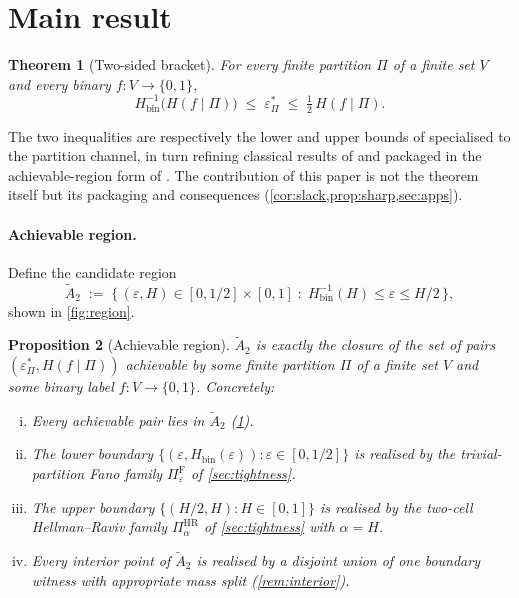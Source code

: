 \documentclass[10pt]{article}
\newtheorem{theorem}{Theorem}
\newtheorem{proposition}[theorem]{Proposition}
\theoremstyle{definition}
\theoremstyle{remark}
\newcommand{\Hbin}{H_{\mathrm{bin}}}
\newcommand{\Hinv}{H_{\mathrm{bin}}^{-1}}
\newcommand{\eps}{\varepsilon}
\newcommand{\epsP}{\eps^{\!*}_{\Pi}}
\newcommand{\Atilde}{\widetilde{A}_{2}}
\begin{document}
\section{Main result}\label{sec:main}

\begin{theorem}[Two-sided bracket]\label{thm:sandwich}
For every finite partition $\Pi$ of a finite set $V$ and every
binary $f : V \to \{0, 1\}$,
\begin{equation}\label{eq:sandwich}
  \Hinv\!\bigl(H(f \mid \Pi)\bigr)
  \;\le\; \epsP
  \;\le\; \tfrac{1}{2}\,H(f \mid \Pi).
\end{equation}
\end{theorem}

The two inequalities are respectively the lower and upper bounds
of \citet{ho2010interplay} specialised to the partition channel,
in turn refining classical results of \citet{fano1961} and
\citet{hellmanraviv1970} packaged in the achievable-region form
of \citet{feder1994}. The contribution of this paper is not the
theorem itself but its packaging and consequences
(\cref{cor:slack,prop:sharp,sec:apps}).

\paragraph{Achievable region.} Define the candidate region
\[
  \Atilde
  \;:=\; \bigl\{\,(\eps, H) \in [0, 1/2] \times [0, 1]
    \;:\; \Hinv(H) \le \eps \le H/2 \,\bigr\},
\]
shown in \cref{fig:region}.

\begin{proposition}[Achievable region]\label{prop:region}
$\Atilde$ is exactly the closure of the set of pairs
$(\epsP, H(f \mid \Pi))$ achievable by some finite partition $\Pi$
of a finite set $V$ and some binary label $f : V \to \{0, 1\}$.
Concretely:
\begin{enumerate}[(i)]
  \item Every achievable pair lies in $\Atilde$
    (\cref{thm:sandwich}).
  \item The lower boundary $\{(\eps, \Hbin(\eps)) : \eps \in [0, 1/2]\}$
    is realised by the trivial-partition Fano family
    $\Pi^{\mathrm{F}}_{\eps}$ of \cref{sec:tightness}.
  \item The upper boundary $\{(H/2, H) : H \in [0, 1]\}$ is
    realised by the two-cell Hellman--Raviv family
    $\Pi^{\mathrm{HR}}_{\alpha}$ of \cref{sec:tightness} with
    $\alpha = H$.
  \item Every interior point of $\Atilde$ is realised by a
    disjoint union of one boundary witness with appropriate
    mass split (\cref{rem:interior}).
\end{enumerate}
\end{proposition}
\end{document}
